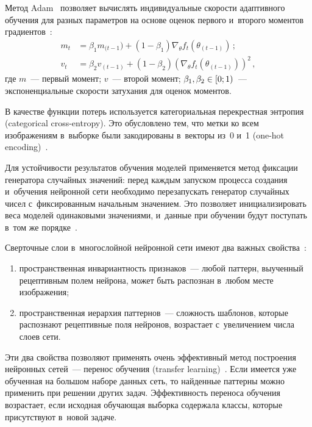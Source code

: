 \begin{multicols}{2}
  Метод Adam~\cite{11-ark} позволяет вычислять индивидуальные скорости 
адап\-тив\-но\-го обуче\-ния для разных па\-ра\-мет\-ров на основе оценок первого 
и~второго моментов градиентов~\cite{11-ark}:
  \begin{align*}
  m_t&= \beta_1 m_{(t-1}) +\left( 1-\beta_1\right) \nabla_\theta f_t \left(  
\theta_{(t-1)} \right)\,;\\
  v_t &= \beta_2 v_{(t-1)} +\left(1-\beta_2\right) \left( \nabla_\theta f_t \left( 
\theta_{(t-1)}\right)\right)^2\,,
  \end{align*}
где $m$~--- первый момент; $v$~--- второй момент;  
$\beta_1, \beta_2 \hm\in [0; 1)$~--- экспоненциальные скорости затухания для 
оценок моментов. 
  
  В качестве функции потерь используется категориальная перекрестная 
энтропия (categorical cross-entropy). Это обуслов\-ле\-но тем, что метки ко всем 
изображениям в~выборке были закодированы в~век\-то\-ры из~0 и~1 (one-hot 
encoding)~\cite{7-ark}.
  
  Для устойчивости результатов обучения моделей применяется метод 
фиксации генератора случайных значений: перед каж\-дым запуском процесса 
создания и~обуче\-ния нейронной сети необходимо перезапускать генератор 
случайных чисел с~фиксированным начальным значением. Это позволяет 
инициализировать веса моделей одинаковыми значениями, и~данные при 
обуче\-нии будут по\-сту\-пать в~том же порядке~\cite{7-ark}.
  
  Сверточные слои в~многослойной нейронной сети имеют два важных 
свойства~\cite{6-ark}:
  \begin{enumerate}[(1)]
  \item  пространственная ин\-ва\-ри\-ант\-ность признаков~--- любой пат\-терн, 
вы\-учен\-ный рецептивным полем нейрона, может быть распознан в~любом месте 
изображения;
  \item пространственная иерархия паттернов~--- слож\-ность шаб\-ло\-нов, 
которые рас\-по\-зна\-ют рецептивные поля нейронов, воз\-рас\-та\-ет с~увеличением 
чис\-ла слоев сети. 
  \end{enumerate}
  
  Эти два свойства позволяют применять очень эффективный метод 
построения нейронных сетей~--- перенос обуче\-ния (transfer  
learning)~\cite{7-ark}. Если имеется уже обучен\-ная на большом наборе данных 
сеть, то найденные паттерны можно применить при решении других задач. 
Эффективность переноса обуче\-ния возрастает, если исходная обуча\-ющая 
выборка содержала классы, которые присутствуют в~новой задаче.
  

\end{multicols}

